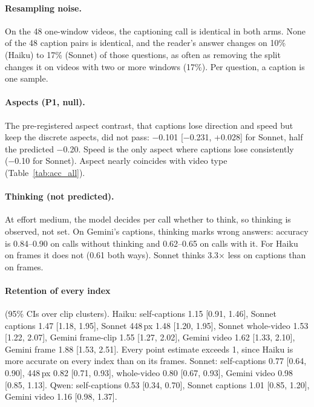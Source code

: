 \documentclass[11pt]{article}
\begin{document}
\paragraph{Resampling noise.} On the 48 one-window videos, the captioning call is identical in both arms. None of the 48 caption pairs is identical, and the reader's answer changes on 10\% (Haiku) to 17\% (Sonnet) of those questions, as often as removing the split changes it on videos with two or more windows (17\%). Per question, a caption is one sample.

\paragraph{Aspects (P1, null).} The pre-registered aspect contrast, that captions lose direction and speed but keep the discrete aspects, did not pass: −0.101 [−0.231, +0.028] for Sonnet, half the predicted −0.20. Speed is the only aspect where captions lose consistently (−0.10 for Sonnet). Aspect nearly coincides with video type (Table~\ref{tab:acc_all}).

\paragraph{Thinking (not predicted).} At effort medium, the model decides per call whether to think, so thinking is observed, not set. On Gemini's captions, thinking marks wrong answers: accuracy is 0.84--0.90 on calls without thinking and 0.62--0.65 on calls with it. For Haiku on frames it does not (0.61 both ways). Sonnet thinks 3.3× less on captions than on frames.

\paragraph{Retention of every index} (95\% CIs over clip clusters). Haiku: self-captions 1.15 [0.91, 1.46], Sonnet captions 1.47 [1.18, 1.95], Sonnet 448\,px 1.48 [1.20, 1.95], Sonnet whole-video 1.53 [1.22, 2.07], Gemini frame-clip 1.55 [1.27, 2.02], Gemini video 1.62 [1.33, 2.10], Gemini frame 1.88 [1.53, 2.51]. Every point estimate exceeds 1, since Haiku is more accurate on every index than on its frames. Sonnet: self-captions 0.77 [0.64, 0.90], 448\,px 0.82 [0.71, 0.93], whole-video 0.80 [0.67, 0.93], Gemini video 0.98 [0.85, 1.13]. Qwen: self-captions 0.53 [0.34, 0.70], Sonnet captions 1.01 [0.85, 1.20], Gemini video 1.16 [0.98, 1.37].
\end{document}
